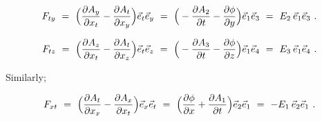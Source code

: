 \documentclass{article}
\begin{document}
\begin{equation} \label{eq:1002}
F_{t y} \hspace{0.125cm} = \hspace{0.125cm}  \Big( \frac{\partial{A_{y}}}{\partial{x_{t}}} - \frac{\partial{A_{t}}}{\partial{x_{y}}} \Big) \vec{e}_{t} \vec{e}_{y} \hspace{0.125cm} = \hspace{0.125cm} \Big( - \frac{\partial{A_{2}}}{\partial{t}} - \frac{\partial{\phi}}{\partial{y}} \Big) \vec{e}_{1} \vec{e}_{3} \hspace{0.125cm} = \hspace{0.125cm} E_2 \hspace{0.075cm} \vec{e}_{1} \vec{e}_{3} \hspace{0.125cm} .
\end{equation}

\begin{equation} \label{eq:1002}
F_{t z} \hspace{0.125cm} = \hspace{0.125cm}  \Big( \frac{\partial{A_{z}}}{\partial{x_{t}}} - \frac{\partial{A_{t}}}{\partial{x_{z}}} \Big) \vec{e}_{t} \vec{e}_{z} \hspace{0.125cm} = \hspace{0.125cm} \Big( - \frac{\partial{A_{3}}}{\partial{t}} - \frac{\partial{\phi}}{\partial{z}} \Big) \vec{e}_{1} \vec{e}_{4} \hspace{0.125cm} = \hspace{0.125cm} E_3 \hspace{0.075cm} \vec{e}_{1} \vec{e}_{4} \hspace{0.125cm} .
\end{equation}

Similarly;

\begin{equation} \label{eq:1002}
F_{x t} \hspace{0.125cm} = \hspace{0.125cm}  \Big( \frac{\partial{A_{t}}}{\partial{x_{x}}} - \frac{\partial{A_{x}}}{\partial{x_{t}}} \Big) \vec{e}_{x} \vec{e}_{t} \hspace{0.125cm} = \hspace{0.125cm} \Big(  \frac{\partial{\phi}}{\partial{x}} + \frac{\partial{A_{1}}}{\partial{t}} \Big) \vec{e}_{2} \vec{e}_{1} \hspace{0.125cm} = \hspace{0.125cm} - E_1 \hspace{0.075cm} \vec{e}_{2} \vec{e}_{1} \hspace{0.125cm} .
\end{equation}
\end{document}
